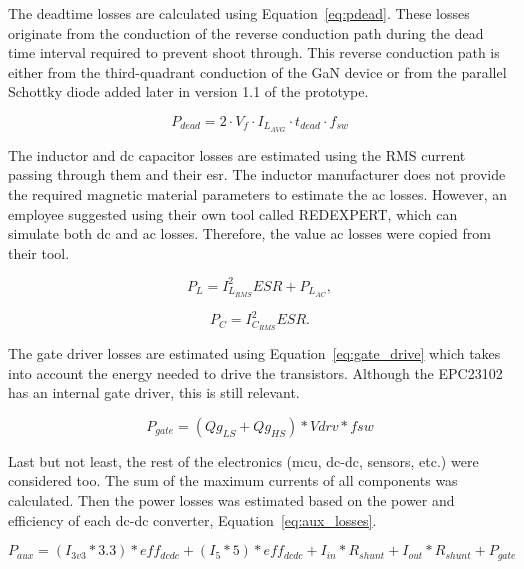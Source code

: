         The deadtime losses are calculated using Equation~\ref{eq:pdead}. These losses originate from the conduction of the reverse conduction path during the dead time interval required to prevent shoot through. This reverse conduction path is either from the third-quadrant conduction of the GaN device or from the parallel Schottky diode added later in version 1.1 of the prototype.

        \begin{equation}
        P_{dead}=2\cdot  V_f \cdot I_{L_{AVG}} \cdot t_{dead} \cdot f_{sw}
        \label{eq:pdead}
        \end{equation}

        The inductor and \acs{dc} capacitor losses are estimated using the RMS current passing through them and their \ac{esr}. The inductor manufacturer does not provide the required magnetic material parameters to estimate the \acs{ac} losses. However, an employee suggested using their own tool called REDEXPERT, which can simulate both \acs{dc} and \acs{ac} losses. Therefore, the value \acs{ac} losses were copied from their tool.

        \begin{equation}
        P_L=I_{L_{RMS}}^{2}ESR + P_{L_{AC}},
        \end{equation}

        \begin{equation}
        P_C=I_{C_{RMS}}^{2}ESR.
        \end{equation}

        

        The gate driver losses are estimated using Equation~\ref{eq:gate_drive} which takes into account the energy needed to drive the transistors. Although the EPC23102 has an internal gate driver, this is still relevant.

        \begin{equation}
        P_{gate}= (Qg_{LS} + Qg_{HS})* Vdrv * fsw
        \label{eq:gate_drive}
        \end{equation}

        Last but not least, the rest of the electronics (\acs{mcu}, \acs{dc}-\acs{dc}, sensors, etc.) were considered too. The sum of the maximum currents of all components was calculated. Then the power losses was estimated based on the power and efficiency of each \acs{dc}-\acs{dc} converter, Equation~\ref{eq:aux_losses}.

        \begin{equation}
            P_{aux} = (I_{3v3} * 3.3) * eff_{dcdc} + (I_{5} * 5) * eff_{dcdc} + I_{in}*R_{shunt} + I_{out}*R_{shunt} + P_{gate}
            \label{eq:aux_losses}
        \end{equation}

